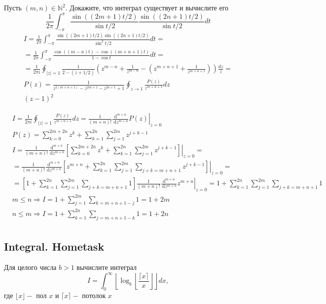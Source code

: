 	Пусть $(m, n) \in \mathbb{N}^2$. Докажите, что интеграл существует и вычислите его
	$$
	\frac{1}{2 \pi} \int_{-\pi}^\pi \frac{\sin ((2 m+1) t / 2)}{\sin t / 2} \frac{\sin ((2 n+1) t / 2)}{\sin t / 2} d t
	$$
	$$
	\begin{gathered}
		I=\frac{1}{2 \pi} \int_{-\pi}^\pi \frac{\sin ((2 m+1) t / 2) \sin ((2 n+1) t / 2)}{\sin ^2 t / 2} d t= \\
		=\frac{1}{2 \pi} \int_{-\pi}^\pi \frac{\cos ((m-n) t)-\cos ((m+n+1) t)}{1-\cos t} d t= \\
		=\frac{1}{2 \pi i} \oint_{|z|=1} \frac{1}{2-(z+1 / 2)}\left(z^{m-n}+\frac{1}{z^{m-n}}-\left(z^{m+n+1}+\frac{1}{z^{m+n+1}}\right)\right) \frac{d z}{z}= \\
		P(z)=\frac{1}{z^{2(m+n+1)}-z^{2 m+1}-z^{2 n+1}+1} \oint_{z \rightarrow 1} \frac{P(z)}{z^{m+n+1}} d z \\
		(z-1)^2
	\end{gathered}
	$$
	
	$$
	\begin{aligned}
		& I=\frac{1}{2 \pi i} \oint_{|z|=1} \frac{P(z)}{z^{m+n+1}} d z=\left.\frac{1}{(m+n) !} \frac{\mathrm{d}^{m+n}}{\mathrm{~d} z^{m+n}} P(z)\right|_{z=0} \\
		& P(z)=\sum_{k=0}^{2 m+2 n} z^k+\sum_{k=1}^{2 n} \sum_{j=1}^{2 m} z^{j+k-1} \\
		& I=\left.\frac{1}{(m+n) !} \frac{\mathrm{d}^{m+n}}{\mathrm{~d} z^{m+n}}\left[\sum_{k=0}^{2 m+2 n} z^k+\sum_{k=1}^{2 n} \sum_{j=1}^{2 m} z^{j+k-1}\right]\right|_{z=0}= \\
		& =\left.\frac{1}{(m+n) !} \frac{\mathrm{d}^{m+n}}{\mathrm{~d} z^{m+n}}\left[z^{m+n}+\sum_{k=1}^{2 n} \sum_{j=1}^{2 m} \sum_{j+k=m+n+1} z^{j+k-1}\right]\right|_{z=0}= \\
		& =\left.\left[1+\sum_{k=1}^{2 n} \sum_{j=1}^{2 m} \sum_{j+k=m+n+1} 1\right] \frac{1}{(m+n) !} \frac{\mathrm{d}^{m+n}}{\mathrm{~d} z^{m+n}} z^{m+n}\right|_{z=0}=1+\sum_{k=1}^{2 n} \sum_{j=1}^{2 m} \sum_{j+k=m+n+1} 1 \\
		& m \leq n \Rightarrow I=1+\sum_{j=1}^{2 m} \sum_{k=m+n+1-j} 1=1+2 m \\
		& n \leq m \Rightarrow I=1+\sum_{k=1}^{2 n} \sum_{j=m+n+1-k} 1=1+2 n \\
		&
	\end{aligned}
	$$
	
	\subsection{Integral. Hometask}
	Для целого числа $b>1$ вычислите интеграл
	$$
	I=\int_0^{\infty}\left\lfloor\log _b\left\lfloor\frac{\lceil x\rceil}{x}\right\rfloor\right\rfloor d x,
	$$
	где $\lfloor x\rfloor-$ пол $x$ и $\lceil x\rceil-$ потолок $x$
	
